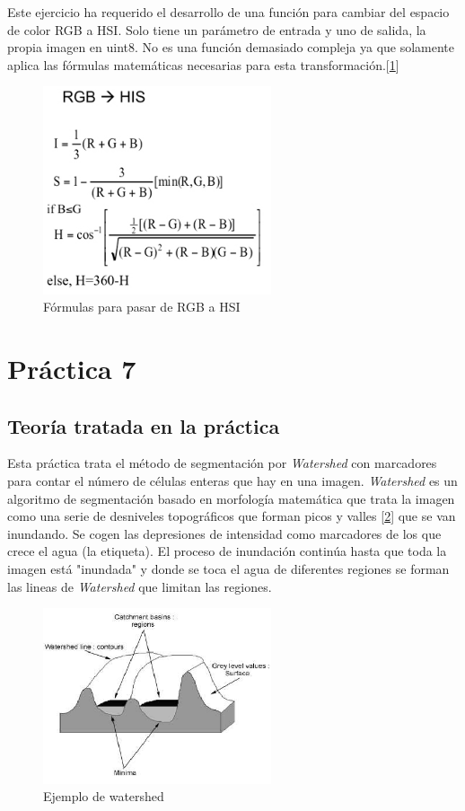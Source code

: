 \documentclass[a4paper,12pt]{report}
\begin{document}
Este ejercicio ha requerido el desarrollo de una función para cambiar del espacio de color RGB a HSI. Solo tiene un parámetro de entrada y uno de salida, la propia imagen en uint8. No es una función demasiado compleja ya que solamente aplica las fórmulas matemáticas necesarias para esta transformación.[\ref{rgb2hsi}]

\begin{figure}[h]
\centering
\includegraphics[width=0.6\textwidth]{imagenes/rgb2hsi}
\caption{Fórmulas para pasar de RGB a HSI}
\label{rgb2hsi} 
\end{figure}

\section{ Práctica 7}
\subsection{Teoría tratada en la práctica}

Esta práctica trata el método de segmentación por \emph{Watershed} con marcadores para contar el número de células enteras que hay en una imagen.\emph{ Watershed} es un algoritmo de segmentación basado en morfología matemática que trata la imagen como una serie de desniveles topográficos que forman picos y valles [\ref{watershed}] que se van inundando. Se cogen las depresiones de intensidad como marcadores de los que crece el agua (la etiqueta). El proceso de inundación continúa hasta que toda la imagen está "inundada" y donde se toca el agua de diferentes regiones se forman las lineas de  \emph{Watershed} que limitan las regiones.\\

\begin{figure}[h]
\centering
\includegraphics[width=0.6\textwidth]{imagenes/valles}
\caption{Ejemplo de watershed}
\label{watershed} 
\end{figure}
\end{document}
